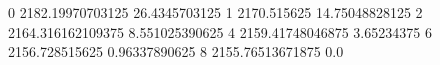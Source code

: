 0 2182.19970703125 26.4345703125
1 2170.515625 14.75048828125
2 2164.316162109375 8.551025390625
4 2159.41748046875 3.65234375
6 2156.728515625 0.96337890625
8 2155.76513671875 0.0

